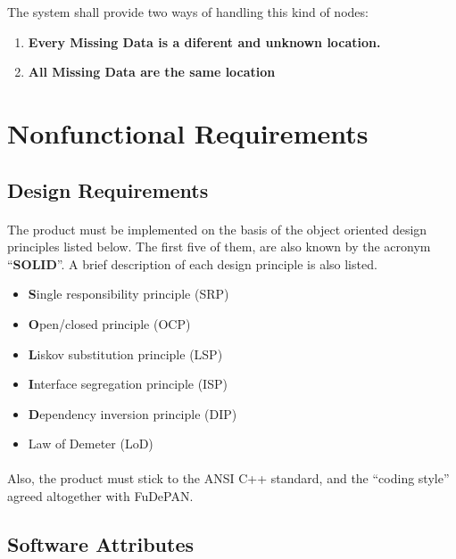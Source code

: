 \documentclass[10pt,a4paper]{article}
\begin{document}
	The system shall provide two ways of handling this kind of nodes:
	
	\begin{enumerate}
    \item \textbf{Every Missing Data is a diferent and unknown location. }
	\item \textbf{All Missing Data are the same location }
    \end{enumerate}

 



\section{Nonfunctional Requirements}
  \label{section-nreq}  
    \subsection{Design Requirements}
\paragraph{}
The product must be implemented on the basis of the object oriented design principles listed below. The first five of them, are also known by the acronym ``\textbf{SOLID}''. A brief description of each design principle is also listed.

    \begin{itemize}
      \item \textbf{S}ingle responsibility principle (SRP)
      \item \textbf{O}pen/closed principle (OCP)
      \item \textbf{L}iskov substitution principle (LSP)
      \item \textbf{I}nterface segregation principle (ISP)
      \item \textbf{D}ependency inversion principle (DIP)   
      \item Law of Demeter (LoD)
    \end{itemize}
\paragraph{}
Also, the product must stick to the ANSI C++ standard, and the ``coding style'' agreed altogether with FuDePAN.

\subsection{Software Attributes}
\end{document}
